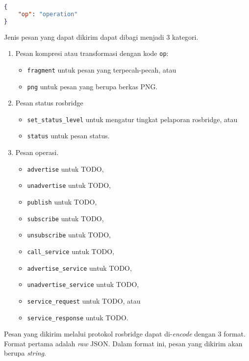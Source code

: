 \begin{lstlisting}[language=JSON, caption=contoh pesan valid pada lapisan transpor rosbridge]
{
    "op": "operation"
}
\end{lstlisting}

Jenis pesan yang dapat dikirim dapat dibagi menjadi 3 kategori.
\begin{enumerate}
    \item Pesan kompresi atau transformasi dengan kode \texttt{op}:
          \begin{itemize}
              \item \texttt{fragment} untuk pesan yang terpecah-pecah, atau
              \item \texttt{png} untuk pesan yang berupa berkas PNG.
          \end{itemize}
    \item Pesan status rosbridge
          \begin{itemize}
              \item \texttt{set\_status\_level} untuk mengatur tingkat pelaporan
                    rosbridge, atau
              \item \texttt{status} untuk pesan status.
          \end{itemize}
    \item Pesan operasi.
          \begin{itemize}
              \item \texttt{advertise} untuk TODO,
              \item \texttt{unadvertise} untuk TODO,
              \item \texttt{publish} untuk TODO,
              \item \texttt{subscribe} untuk TODO,
              \item \texttt{unsubscribe} untuk TODO,
              \item \texttt{call\_service} untuk TODO,
              \item \texttt{advertise\_service} untuk TODO,
              \item \texttt{unadvertise\_service} untuk TODO,
              \item \texttt{service\_request} untuk TODO, atau
              \item \texttt{service\_response} untuk TODO.
          \end{itemize}
\end{enumerate}

Pesan yang dikirim melalui protokol rosbridge dapat di-\textit{encode} dengan 3 format.
Format pertama adalah \textit{raw} JSON.
Dalam format ini, pesan yang dikirim akan berupa \textit{string}.

